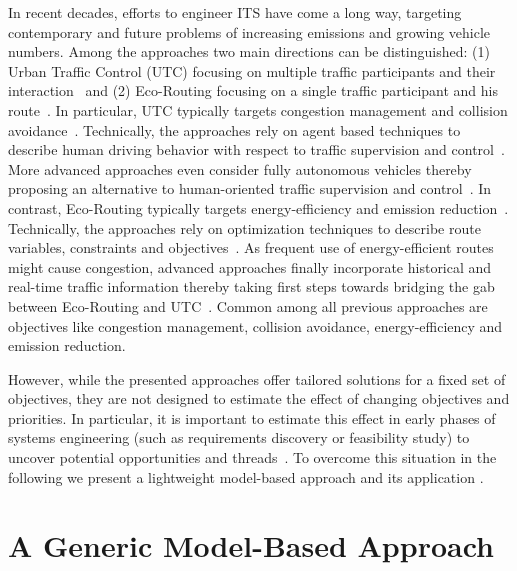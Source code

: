\documentclass[conference]{../cls/IEEEtran}
\begin{document}
In recent decades, efforts to engineer ITS have come a long way, targeting contemporary and future problems of increasing emissions and growing vehicle numbers. Among the approaches two main directions can be distinguished: (1) Urban Traffic Control (UTC) focusing on multiple traffic participants and their interaction~\cite{Chen2010,Dresner2008} and (2) Eco-Routing focusing on a single traffic participant and his route~\cite{Ericsson2006, Barth2007,Boriboonsomsin2012}. In particular, UTC typically targets congestion management and collision avoidance~\cite{Chen2010}. Technically, the approaches rely on agent based techniques to describe human driving behavior with respect to traffic supervision and control~\cite{Chen2010}. More advanced approaches even consider fully autonomous vehicles thereby proposing an alternative to human-oriented traffic supervision and control~\cite{Dresner2008}. In contrast, Eco-Routing typically targets energy-efficiency and emission reduction~\cite{Ericsson2006,Barth2007}. Technically, the approaches rely on optimization techniques to describe route variables, constraints and objectives~\cite{Ericsson2006,Barth2007}. As frequent use of energy-efficient routes might cause congestion, advanced approaches finally incorporate historical and real-time traffic information thereby taking first steps towards bridging the gab between Eco-Routing and UTC~\cite{Boriboonsomsin2012}. Common among all previous approaches are objectives like congestion management, collision avoidance, energy-efficiency and emission reduction.

However, while the presented approaches offer tailored solutions for a fixed set of objectives, they are not designed to estimate the effect of changing objectives and priorities. In particular, it is important to estimate this effect in early phases of systems engineering (such as requirements discovery or feasibility study) to uncover potential opportunities and threads~\cite{Whitten2005}. To overcome this situation in the following we present a lightweight model-based approach and its application .

\section{A Generic Model-Based Approach}
\end{document}
